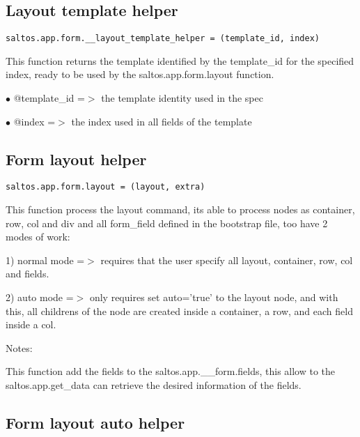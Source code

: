 \documentclass[a4paper]{book}
\begin{document}
\hypertarget{toc379}{}
\subsection{Layout template helper}

\begin{lstlisting}
saltos.app.form.__layout_template_helper = (template_id, index)
\end{lstlisting}

This function returns the template identified by the template\_id for the specified index, ready
to be used by the saltos.app.form.layout function.

\begin{compactitem}
\item[\color{myblue}$\bullet$] @template\_id =$>$ the template identity used in the spec
\item[\color{myblue}$\bullet$] @index       =$>$ the index used in all fields of the template
\end{compactitem}

\hypertarget{toc380}{}
\subsection{Form layout helper}

\begin{lstlisting}
saltos.app.form.layout = (layout, extra)
\end{lstlisting}

This function process the layout command, its able to process nodes as container, row, col and div
and all form\_field defined in the bootstrap file, too have 2 modes of work:

1) normal mode =$>$ requires that the user specify all layout, container, row, col and fields.

2) auto mode =$>$ only requires set auto='true' to the layout node, and with this, all childrens
of the node are created inside a container, a row, and each field inside a col.

Notes:

This function add the fields to the saltos.app.\_\_form.fields, this allow to the saltos.app.get\_data
can retrieve the desired information of the fields.

\hypertarget{toc381}{}
\subsection{Form layout auto helper}
\end{document}
